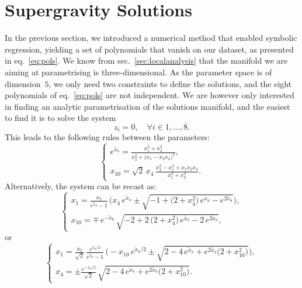 \documentclass[11pt,a4paper]{article}
\begin{document}
\section{Supergravity Solutions} \label{sec:sugrasol}
In the previous section, we introduced a numerical method that enabled symbolic regression, yielding a set of polynomials that vanish on our dataset, as presented in eq.~\eqref{eq:pols}. We know from sec.~\ref{sec:localanalysis} that the manifold we are aiming at parametrising is three-dimensional. As the parameter space is of dimension~$5$, we only need two constraints to define the solutions, and the eight polynomials of eq.~\eqref{eq:pols} are not independent. We are however only interested in finding an analytic parametrisation of the solutions manifold, and the easiest to find it is to solve the system
	\begin{equation}\label{eq:solvepol}
		z_i = 0, \quad \forall i \in {1,\dots,8}.
	\end{equation}
	This leads to the following rules between the parameters:
	\begin{equation}\label{eq:rulex8x10}
		\begin{cases}
			\displaystyle e^{\tilde{x}_{8}} = \frac{x_{1}^{2}+x_{2}^{2}}{x_{2}^{2} + \big(x_{1}-x_{2}x_{4}\big)^{2}},\\[10pt]
			\displaystyle x_{10} = \sqrt{2}\,x_{4}\,\frac{x_{2}^{2} - x_{1}^{2}+x_{1}x_{2}x_{4}}{x_{1}^{2}+x_{2}^{2}}.
		\end{cases}
	\end{equation}
	Alternatively, the system can be recast as:
	\begin{equation}
		\begin{cases}
			\displaystyle x_{1} = \frac{x_{2}}{e^{\tilde{x}_{8}}-1}\,\Big(x_{4}\,e^{\tilde{x}_{8}} \pm \sqrt{-1+\big(2+x_{4}^{2}\big)\,e^{x_{8}}-e^{2\tilde{x}_{8}}}\Big),\\[8pt]
			\displaystyle x_{10} = \mp\,e^{-\tilde{x}_{8}}\,\sqrt{-2+2\,\big(2+x_{4}^{2}\big)\,e^{\tilde{x}_{8}}-2\,e^{2\tilde{x}_{8}}},
		\end{cases}
	\end{equation}
	or
	\begin{equation}
		\begin{cases}
			\displaystyle x_{1} = \frac{x_{2}}{\sqrt{2}}\,\frac{e^{\tilde{x}_{8}/2}}{e^{\tilde{x}_{8}}-1}\,\Big(-x_{10}\,e^{\tilde{x}_{8}/2} \pm \sqrt{2-4\,e^{\tilde{x}_{8}}+e^{2\tilde{x}_{8}}\big(2+x_{10}^{2}\big)}\Big),\\[8pt]
			\displaystyle x_{4} = \pm \frac{e^{-x_{8}/2}}{\sqrt{2}}\,\sqrt{2-4\,e^{\tilde{x}_{8}}+e^{2\tilde{x}_{8}}\big(2+x_{10}^{2}\big)}.
		\end{cases}
	\end{equation}
\end{document}
